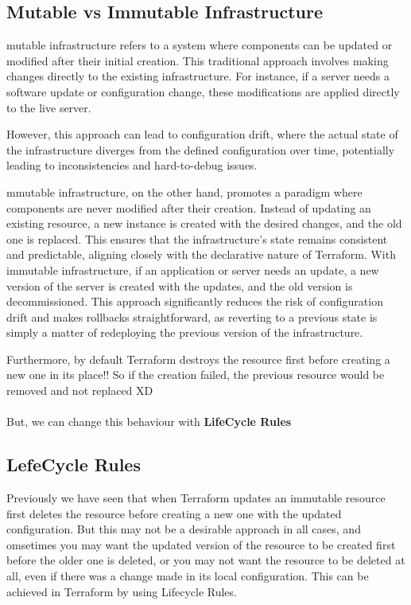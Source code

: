 \documentclass{article}
\newenvironment{blocktemplateIII}[1]{%
    \tcolorbox[beamer,%
    noparskip,breakable,
    ,colframe=Red,%
    colbacklower=LimeGreen!75!LightGreen,%
    title=#1]}%
    {\endtcolorbox}
\begin{document}
\subsection{Mutable vs Immutable Infrastructure}
mutable infrastructure refers to a system where components can be updated or modified after their initial creation. This traditional approach involves making changes directly to the existing infrastructure. For instance, if a server needs a software update or configuration change, these modifications are applied directly to the live server. 

However, this approach can lead to configuration drift, where the actual state of the infrastructure diverges from the defined configuration over time, potentially leading to inconsistencies and hard-to-debug issues.

mmutable infrastructure, on the other hand, promotes a paradigm where components are never modified after their creation. Instead of updating an existing resource, a new instance is created with the desired changes, and the old one is replaced. This ensures that the infrastructure's state remains consistent and predictable, aligning closely with the declarative nature of Terraform. With immutable infrastructure, if an application or server needs an update, a new version of the server is created with the updates, and the old version is decommissioned. This approach significantly reduces the risk of configuration drift and makes rollbacks straightforward, as reverting to a previous state is simply a matter of redeploying the previous version of the infrastructure.

\begin{blocktemplateIII}{WARNING}
Furthermore, by default Terraform destroys the resource first before creating a new one in its place!! So if the creation failed, the previous resource would be removed and not replaced XD
\\\\
But, we can change this behaviour with \textbf{LifeCycle Rules}
\end{blocktemplateIII}

\subsection{LefeCycle Rules}
Previously we have seen that when Terraform updates an immutable resource first deletes the resource before creating a new one with the updated configuration. But this may not be a desirable approach in all cases, and omsetimes you may want the updated version of the resource to be created first before the older one is deleted, or you may not want the resource to be deleted at all, even if there was a change made in its local configuration. This can be achieved in Terraform by using Lifecycle Rules.
\end{document}

